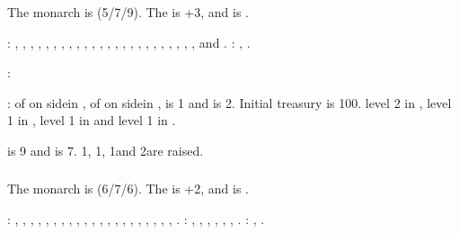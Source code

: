 \subsubsection{\paysmajeurFrance}
\aparag The monarch is  (5/7/9). The \STAB is +3, and
\FRA is .

: \provinceFinistere, \provinceArmor,
\provinceMorbihan, \provinceVendee, \provincePoitou, \provinceLimousin,
\provinceTouraine, \provinceMaine, \provinceNormandie, \provinceCaux,
, \provinceOrleanais, \provinceBerry,
\provinceAuvergne, \provinceCevennes, \provinceQuercy, \provinceGuyenne,
\provinceBearn, \provinceLanguedoc, \provinceProvence, \provinceDauphine,
\provinceLyonnais, \provinceBourgogne, \provinceTroyes, \provinceChampagne and
\provincePicardie.
: \seazoneAcores, \seazoneCanarias.

:
\begin{modlist}
\item[\MA] \payssavoie
\end{modlist}

:
\bparag \MNU of  on side\facemoins in \provinceChampagne, \MNU of
 on side\facemoins in \provinceGuyenne, \FTI is 1 and \DTI is 2.
\bparag Initial treasury is 100\ducats.
\bparag \TradeFLEET level 2 in , level 1 in , level 1 in
 and level 1 in .

\aparag {} is 9 and  is
7. 1\ARMY\faceplus, 1\ARMY\facemoins, 1\ND and 2\NGD are raised.


\subsubsection{\paysmajeurEspagne}
\aparag The monarch is  (6/7/6). The \STAB is
+2, and \SPA is .

: \provinceGaliza, \provinceSalamanca,
\provinceExtremadura, \provinceHuelva, \provinceGibraltar, \provinceGranada,
\provinceMurcia, , \provinceToledo, , , \provinceAsturias, \provinceVizcaya,
\provinceNavarra, \provincePirineos, \provinceCatalunya, \provinceLeon,
\provinceCaceres, \provinceAndalucia, \provinceCordoba, \provinceValencia,
\provinceAragon.
: , \provinceRosselo,
\provinceSaldigna, \provinceSicilia, \provincePalermo, \provinceMalta,
\provinceCanarias.
: \seazoneAcores, \seazoneCanarias.

